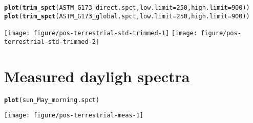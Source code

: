 \documentclass{article}\usepackage[]{graphicx}\usepackage[]{color}
\makeatletter
\newcommand{\hlnum}[1]{\textcolor[rgb]{0.686,0.059,0.569}{#1}}%
\newcommand{\hlstd}[1]{\textcolor[rgb]{0.345,0.345,0.345}{#1}}%
\newcommand{\hlkwc}[1]{\textcolor[rgb]{0.333,0.667,0.333}{#1}}%
\newcommand{\hlkwd}[1]{\textcolor[rgb]{0.737,0.353,0.396}{\textbf{#1}}}%
\newenvironment{kframe}{%
 \def\at@end@of@kframe{}%
 \ifinner\ifhmode%
  \def\at@end@of@kframe{\end{minipage}}%
  \begin{minipage}{\columnwidth}%
 \fi\fi%
 \def\FrameCommand##1{\hskip\@totalleftmargin \hskip-\fboxsep
 \colorbox{shadecolor}{##1}\hskip-\fboxsep
     \hskip-\linewidth \hskip-\@totalleftmargin \hskip\columnwidth}%
 \MakeFramed {\advance\hsize-\width
   \@totalleftmargin\z@ \linewidth\hsize
   \@setminipage}}%
 {\par\unskip\endMakeFramed%
 \at@end@of@kframe}
\newenvironment{knitrout}{}{} %
\makeatother
\begin{document}
\begin{knitrout}\footnotesize
{}\color{fgcolor}\begin{kframe}
\begin{alltt}
  \hlkwd{plot}\hlstd{(}\hlkwd{trim_spct}\hlstd{(ASTM_G173_direct.spct,} \hlkwc{low.limit}\hlstd{=}\hlnum{250}\hlstd{,} \hlkwc{high.limit}\hlstd{=}\hlnum{900}\hlstd{))}
  \hlkwd{plot}\hlstd{(}\hlkwd{trim_spct}\hlstd{(ASTM_G173_global.spct,} \hlkwc{low.limit}\hlstd{=}\hlnum{250}\hlstd{,} \hlkwc{high.limit}\hlstd{=}\hlnum{900}\hlstd{))}
\end{alltt}
\end{kframe}

{\centering \texttt{[image: figure/pos-terrestrial-std-trimmed-1]} 
\texttt{[image: figure/pos-terrestrial-std-trimmed-2]} 

}



\end{knitrout}

\section{Measured dayligh spectra}

\begin{knitrout}\footnotesize
{}\color{fgcolor}\begin{kframe}
\begin{alltt}
  \hlkwd{plot}\hlstd{(sun_May_morning.spct)}
\end{alltt}
\end{kframe}

{\centering \texttt{[image: figure/pos-terrestrial-meas-1]} 

}



\end{knitrout}
\end{document}
